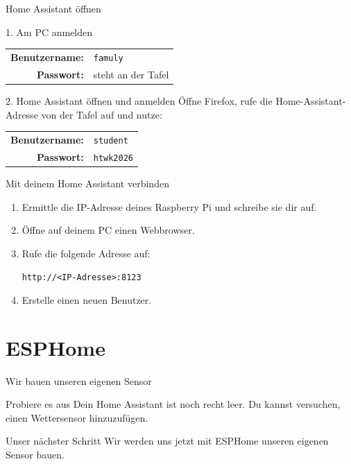 \documentclass[11pt,aspectratio=169]{beamer}
\begin{document}
\begin{frame}{Home Assistant öffnen}
  \begin{block}{1. Am PC anmelden}
    \begin{center}
      \begin{tabular}{rl}
        \textbf{Benutzername:} & \texttt{famuly} \\
        \textbf{Passwort:}     & steht an der Tafel
      \end{tabular}
    \end{center}
  \end{block}

  \begin{block}{2. Home Assistant öffnen und anmelden}
    Öffne Firefox, rufe die Home-Assistant-Adresse von der Tafel auf und nutze:
    \begin{center}
      \begin{tabular}{rl}
        \textbf{Benutzername:} & \texttt{student} \\
        \textbf{Passwort:}     & \texttt{htwk2026}
      \end{tabular}
    \end{center}
  \end{block}
\end{frame}

\begin{frame}{Mit deinem Home Assistant verbinden}
  \begin{enumerate}
    \item Ermittle die IP-Adresse deines Raspberry Pi und schreibe sie dir auf.
    \item Öffne auf deinem PC einen Webbrowser.
    \item Rufe die folgende Adresse auf:

      \begin{center}
        \Large\texttt{http://<IP-Adresse>:8123}
      \end{center}

    \item Erstelle einen neuen Benutzer.
  \end{enumerate}
\end{frame}

\section{ESPHome}

\begin{frame}{Wir bauen unseren eigenen Sensor}
  \begin{block}{Probiere es aus}
    Dein Home Assistant ist noch recht leer. Du kannst versuchen, einen
    Wettersensor hinzuzufügen.
  \end{block}

  \begin{block}{Unser nächster Schritt}
    Wir werden uns jetzt mit ESPHome unseren eigenen Sensor bauen.
  \end{block}
\end{frame}
\end{document}
